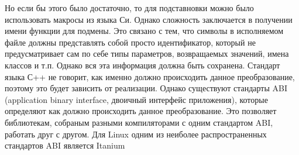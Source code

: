 Но если бы этого было достаточно, то для подставновки можно было использовать
макросы из языка Си. Однако сложность заключается в получении имени функции для
подмены. Это связано с тем, что символы в исполняемом файле должны представлять
собой просто идентификатор, который не предусматривает сам по себе типы
параметров, возвращаемых значений, имена классов и т.п.
Однако вся эта информация должна быть сохранена. Стандарт языка С++ не говорит,
как именно должно происходить данное преобразование, поэтому это будет зависить
от реализации. Однако существуют стандарты ABI (application binary interface,
двоичный интерфейс приложения), которые определяют как должно происходить данное
преобразование. Это позволяет библиотекам, собраным разными компиляторами с
одним стандартом ABI, работать друг с другом. Для Linux одним из неиболее
распространенных стандартов ABI является Itanium\cite{itaniumabi}

